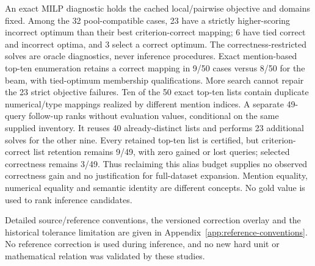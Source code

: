 An exact MILP diagnostic holds the cached local/pairwise objective and
domains fixed. Among the 32 pool-compatible cases, 23 have a strictly
higher-scoring incorrect optimum than their best criterion-correct mapping;
6 have tied correct and incorrect optima, and 3 select a correct optimum.
The correctness-restricted solves are oracle diagnostics, never inference
procedures. Exact mention-based top-ten enumeration retains a correct
mapping in 9/50 cases versus 8/50 for the beam, with tied-optimum membership
qualifications. More search cannot repair the 23 strict objective failures.
Ten of the 50 exact top-ten lists contain duplicate numerical/type mappings
realized by different mention indices. A separate 49-query follow-up ranks without evaluation values, conditional on the same supplied inventory. It reuses
40 already-distinct lists and performs 23 additional solves for the other
nine. Every retained top-ten list is certified, but criterion-correct list
retention remains 9/49, with zero gained or lost queries; selected correctness
remains 3/49. Thus reclaiming this alias budget supplies no observed
correctness gain and no justification for full-dataset expansion. Mention equality, numerical equality and semantic identity are
different concepts. No gold value is used to rank inference candidates.

Detailed source/reference conventions, the versioned correction overlay and the historical tolerance limitation are given in Appendix~\ref{app:reference-conventions}. No reference correction is used during inference, and no new hard unit or mathematical relation was validated by these studies.
